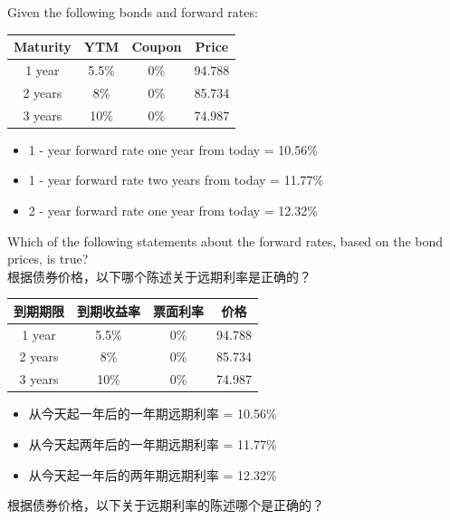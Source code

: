 \documentclass{article}
\newcounter{question} %
\begin{document}
    \begin{question}
        Given the following bonds and forward rates:
        \begin{center}
        \begin{tabular}{|c|c|c|c|}
        \hline
        Maturity & YTM & Coupon & Price \\
        \hline
        1 year & 5.5\% & 0\% & 94.788 \\
        \hline
        2 years & 8\% & 0\% & 85.734 \\
        \hline
        3 years & 10\% & 0\% & 74.987 \\
        \hline
        \end{tabular}
        \end{center}
        \begin{itemize}
        \item 1 - year forward rate one year from today = 10.56\%
        \item 1 - year forward rate two years from today = 11.77\%
        \item 2 - year forward rate one year from today = 12.32\%
        \end{itemize}
        Which of the following statements about the forward rates, based on the bond prices, is true?
        \\根据债券价格，以下哪个陈述关于远期利率是正确的？
        \begin{center}
            \begin{tabular}{|c|c|c|c|}
            \hline
            到期期限 & 到期收益率 & 票面利率 & 价格 \\
            \hline
            1 year & 5.5\% & 0\% & 94.788 \\
            \hline
            2 years & 8\% & 0\% & 85.734 \\
            \hline
            3 years & 10\% & 0\% & 74.987 \\
            \hline
            \end{tabular}
            \end{center}
            \begin{itemize}
            \item 从今天起一年后的一年期远期利率 = 10.56\%
            \item 从今天起两年后的一年期远期利率 = 11.77\%
            \item 从今天起一年后的两年期远期利率 = 12.32\%
            \end{itemize}
            根据债券价格，以下关于远期利率的陈述哪个是正确的？
        \end{question}
        
\end{document}
